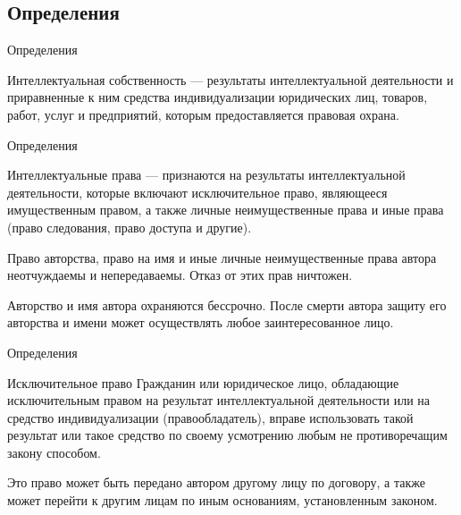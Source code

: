 \documentclass[_Venture_p2.tex]{subfiles}
\begin{document}

\subsection{Определения}
\begin{frame}[shrink=5]{Определения}
\begin{block}{Интеллектуальная собственность}
\quad
— результаты интеллектуальной деятельности и приравненные к ним средства индивидуализации юридических лиц, товаров, работ, услуг и предприятий, которым предоставляется правовая охрана.
\end{block}
\end{frame}

\begin{frame}[shrink=5]{Определения}
\begin{block}{Интеллектуальные права}
	\quad
	— признаются на результаты интеллектуальной деятельности, которые включают исключительное право, являющееся имущественным правом, а также личные неимущественные права и иные права (право следования, право доступа и другие).
	
	Право авторства, право на имя и иные личные неимущественные права автора неотчуждаемы и непередаваемы. Отказ от этих прав ничтожен.
	
	Авторство и имя автора охраняются бессрочно. После смерти автора защиту его авторства и имени может осуществлять любое заинтересованное лицо.
\end{block}
\end{frame}

\begin{frame}[shrink=5]{Определения}
\begin{block}{Исключительное право}
	\quad
	Гражданин или юридическое лицо, обладающие исключительным правом на результат интеллектуальной деятельности или на средство индивидуализации (правообладатель), вправе использовать такой результат или такое средство по своему усмотрению любым не противоречащим закону способом.
	
	Это право может быть передано автором другому лицу по договору, а также может перейти к другим лицам по иным основаниям, установленным законом.
\end{block}
\end{frame}
\end{document}
